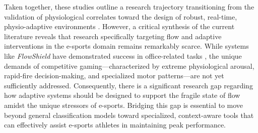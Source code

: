 Taken together, these studies outline a research trajectory transitioning from the validation of physiological correlates toward the design of robust, real-time, physio-adaptive environments \autocite{9296229, irshad2023wearable, ubt_eref88160}. However, a critical synthesis of the current literature reveals that research specifically targeting flow and adaptive interventions in the e-sports domain remains remarkably scarce. While systems like \textit{FlowShield} have demonstrated success in office-related tasks \autocite{ubt_eref88160}, the unique demands of competitive gaming—characterized by extreme physiological arousal, rapid-fire decision-making, and specialized motor patterns—are not yet sufficiently addressed. Consequently, there is a significant research gap regarding how adaptive systems should be designed to support the fragile state of flow amidst the unique stressors of e-sports. Bridging this gap is essential to move beyond general classification models toward specialized, context-aware tools that can effectively assist e-sports athletes in maintaining peak performance.